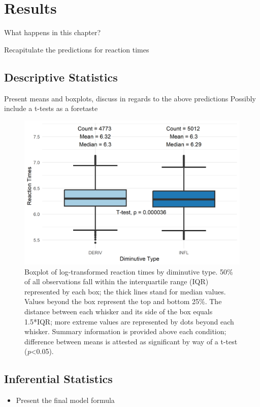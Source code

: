 \chapter{Results}\label{chp:results}

What happens in this chapter?

Recapitulate the predictions for reaction times
\section{Descriptive Statistics} \label{sec:desc_stats}

Present means and boxplots, discuss in regards to the above predictions
Possibly include a t-tests as a foretaste
\begin{figure}[h]
    \centering
    \includegraphics[width=\textwidth]{images/dim_box.png}
    \caption[Boxplot of log-transformed reaction times by diminutive type]{Boxplot of log-transformed reaction times by diminutive type. 50\% of all observations fall within the interquartile range (IQR) represented by each box; the thick lines stand for median values. Values beyond the box represent the top and bottom 25\%. The distance between each whisker and its side of the box equals 1.5*IQR; more extreme values are represented by dots beyond each whisker. Summary information is provided above each condition; difference between means is attested as significant by way of a t-test (\textit{p}<0.05).}
    \label{fig:boxplot}
\end{figure}

\section{Inferential Statistics} \label{sec:inf_stats}
\begin{itemize}
\item Present the final model formula
\end{itemize}

